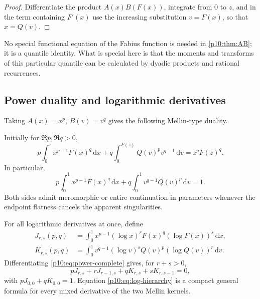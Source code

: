\documentclass[11pt,oneside]{article}
\theoremstyle{definition}
\theoremstyle{remark}
\newcommand{\F}{F}
\newcommand{\Q}{Q}
\newcommand{\dd}{\,\mathrm d}
\newcommand{\1}{\mathbf 1}
\begin{document}
\begin{proof}
Differentiate the product \(A(x)B(\F(x))\), integrate from \(0\) to \(z\), and in
the term containing \(\F'(x)\) use the increasing substitution \(v=\F(x)\),
so that \(x=\Q(v)\).
\end{proof}

\begin{remark}
No special functional equation of the Fabius function is needed in
\cref{p10:thm:AB}; it is a quantile identity.  What is special here is that the moments and
transforms of this particular quantile can be calculated by dyadic products and rational
recurrences.
\end{remark}

\subsection{Power duality and logarithmic derivatives}

Taking \(A(x)=x^p\), \(B(v)=v^q\) gives the following Mellin-type duality.

\begin{corollary}\label{p10:cor:power-duality}
Initially for \(\Re p,\Re q>0\),
\begin{equation}\label{p10:eq:power-incomplete}
 p\int_0^z x^{p-1}\F(x)^q\dd x
 +q\int_0^{\F(z)}\Q(v)^p v^{q-1}\dd v
 =z^p\F(z)^q.
\end{equation}
In particular,
\begin{equation}\label{p10:eq:power-complete}
 p\int_0^1x^{p-1}\F(x)^q\dd x
 +q\int_0^1v^{q-1}\Q(v)^p\dd v=1.
\end{equation}
Both sides admit meromorphic or entire continuation in parameters whenever the endpoint
flatness cancels the apparent singularities.
\end{corollary}

For all logarithmic derivatives at once, define
\begin{align}
 J_{r,s}(p,q)&=\int_0^1x^{p-1}(\log x)^r\F(x)^q(\log\F(x))^s\dd x,\label{p10:eq:Jrs}\\
 K_{r,s}(p,q)&=\int_0^1v^{q-1}(\log v)^s\Q(v)^p(\log\Q(v))^r\dd v.\label{p10:eq:Krs}
\end{align}
Differentiating \cref{p10:eq:power-complete} gives, for \(r+s>0\),
\begin{equation}\label{p10:eq:log-hierarchy}
 pJ_{r,s}+rJ_{r-1,s}+qK_{r,s}+sK_{r,s-1}=0,
\end{equation}
with \(pJ_{0,0}+qK_{0,0}=1\).  Equation \cref{p10:eq:log-hierarchy} is a compact
general formula for every mixed derivative of the two Mellin kernels.
\end{document}
